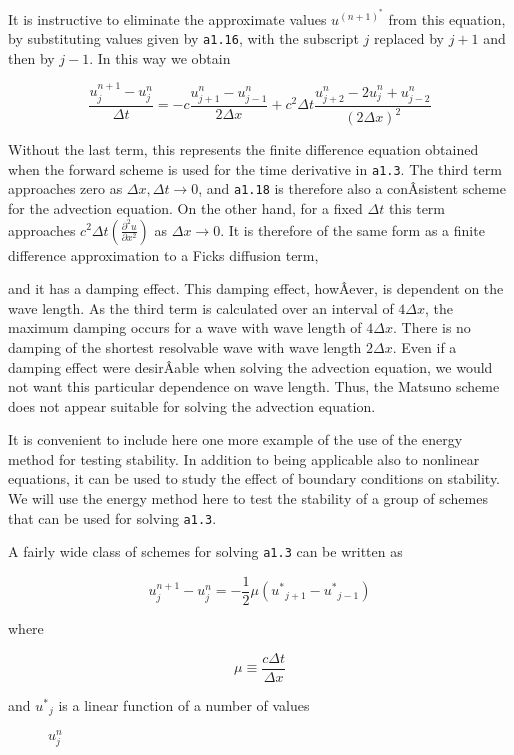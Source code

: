 It is instructive to eliminate the approximate values
\(u^{\left( n + 1 \right)^{*}}\) from this equation, by substituting
values given by \texttt{a1.16}, with the subscript \(j\) replaced by
\(j + 1\) and then by \( j - 1\). In this way we obtain

{\[\frac{u_{j}^{n + 1} - u_{j}^{n}}{\Delta t} =
- c\frac{u_{j + 1}^{n} - u_{j - 1}^{n}}{2\Delta x} +
c^{2}\Delta t\frac{u_{j + 2}^{n} - 
{2u}_{j}^{n} + u_{j - 2}^{n}}{\left( 2\Delta x \right)^{2}}\]}

Without the last term, this represents the finite difference equation
obtained when the forward scheme is used for the time derivative in
\texttt{a1.3}. The third term approaches zero as
\(\Delta x,\Delta t \rightarrow 0\), and \texttt{a1.18} is therefore
also a conÂ­sistent scheme for the advection equation. On the other hand,
for a fixed \(\Delta t\) this term approaches
\(c^{2}\Delta t\left( \frac{\partial^{2}u}{\partial x^{2}} \right)\) as
\(\Delta x \rightarrow 0\). It is therefore of the same form as a finite
difference approximation to a Fick\textquotesingle s diffusion term,

and it has a damping effect. This damping effect, howÂ­ever, is dependent
on the wave length. As the third term is calculated over an interval of
\(4\Delta x\), the maximum damping occurs for a wave with wave length of
\(4\Delta x\). There is no damping of the shortest resolvable wave with
wave length \(2\Delta x\). Even if a damping effect were desirÂ­able when
solving the advection equation, we would not want this particular
dependence on wave length. Thus, the Matsuno scheme does not appear
suitable for solving the advection equation.

It is convenient to include here one more example of the use of the
energy method for testing stability. In addition to being applicable
also to nonlinear equations, it can be used to study the effect of
boundary conditions on stability. We will use the energy method here to
test the stability of a group of schemes that can be used for solving
\texttt{a1.3}.

A fairly wide class of schemes for solving \texttt{a1.3} can be written
as

{\[u_{j}^{n + 1} - u_{j}^{n} = - \frac{1}{2}\mu\left( {u^{*}}_{j + 1} - {u^{*}}_{j - 1} \right)\]}

where

{\[\mu \equiv \frac{c\Delta t}{\Delta x}\]}

\begin{description}
\item[and \({u^{*}}_{j}\) is a linear function of a number of values]
\(u_{j}^{n}\)
\end{description}


